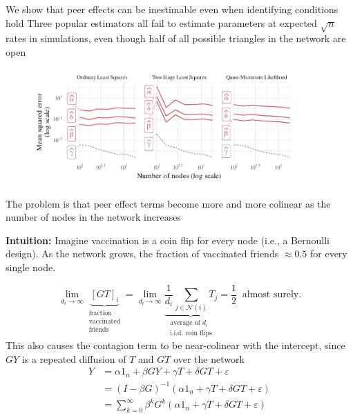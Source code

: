 \documentclass[final]{beamer}
\newcommand{\Ni}{\mathcal N(i)}
\newlength{\colwidth}
\begin{document}
\begin{frame}[t]
\begin{columns}[t]
\begin{column}{\colwidth}
            \begin{block}{We show that peer effects can be inestimable even when identifying conditions hold}
                Three popular estimators all fail to estimate parameters at expected $\sqrt{n}$ rates in simulations, even though half of all possible triangles in the network are open
                \begin{figure}
                    \centering
                    \includegraphics[width=0.9\textwidth]{./figures/simulations/biometrika-mse.pdf}
                \end{figure}
            \end{block}

            \begin{block}{The problem is that peer effect terms become more and more colinear as the number of nodes in the network increases}

                \textbf{Intuition:} Imagine vaccination is a coin flip for every node (i.e., a Bernoulli design). As the network grows, the fraction of vaccinated friends $\approx 0.5$ for every single node.

                \begin{equation} \label{eq:avg}
                    \lim_{d_i \to \infty}
                    \underbrace{[GT]_i}_{\substack{\text{fraction} \\ \text{vaccinated} \\ \text{friends}}}
                    =
                    \lim_{d_i \to \infty}
                    \underbrace{
                        \frac{1}{d_i} \sum_{j \in \Ni} T_j
                    }_{\substack{\text{average of $d_i$}           \\ \text{i.i.d. coin flips}}}
                    = \frac 12 ~ \text{ almost surely.}
                \end{equation}
                This also causes the contagion term to be near-colinear with the intercept, since $GY$ is a repeated diffusion of $T$ and $GT$ over the network
                \begin{align*}
                    Y & = \alpha 1_n + \beta G Y + \gamma T + \delta G T + \varepsilon                                \\
                      & = \left(I - \beta G\right)^{-1} \left(\alpha 1_n + \gamma T + \delta G T + \varepsilon\right) \\
                      & = \sum_{k=0}^\infty \beta^k G^k \left(\alpha 1_n + \gamma T + \delta G T + \varepsilon\right)
                \end{align*}


\end{block}
\end{column}
\end{columns}
\end{frame}
\end{document}
